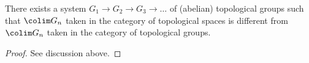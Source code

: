 \begin{lemma}
\label{lemma-colimit-topology}
There exists a system $G_1 \to G_2 \to G_3 \to \ldots$ of (abelian)
topological groups such that $\colim G_n$ taken in the category of
topological spaces is different from $\colim G_n$ taken in the category
of topological groups.
\end{lemma}

\begin{proof}
See discussion above.
\end{proof}










